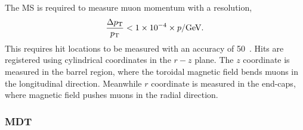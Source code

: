 The MS is required to measure muon momentum with a resolution,
\begin{equation}\begin{split}
    \frac{\Delta p_\text{T}}{p_\text{T}}<1\times10^{-4}\times p/\text{GeV}.
\end{split}\end{equation} 
This requires hit locations to be measured with an accuracy of 50~\um.
Hits are registered using cylindrical coordinates in the $r-z$ plane.
The $z$ coordinate is measured in the barrel region, where the toroidal magnetic field bends muons in the longitudinal direction.
Meanwhile $r$ coordinate is measured in the end-caps, where magnetic field pushes muons in the radial direction. 



\subsubsection{MDT} %

